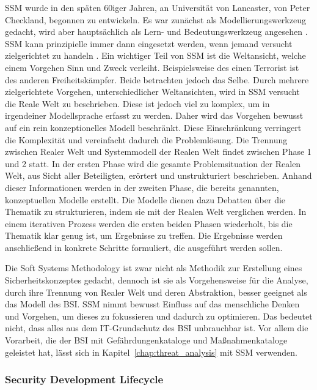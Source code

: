 \documentclass[11pt,a4paper]{report}
\begin{document}
SSM wurde in den späten 60iger Jahren, an Universität von Lancaster, von Peter Checkland, begonnen zu entwickeln. Es war zunächst als Modellierungswerkzeug gedacht, wird aber hauptsächlich als Lern- und Bedeutungswerkzeug angesehen \cite{bobwill}. SSM kann prinzipielle immer dann eingesetzt werden, wenn jemand versucht zielgerichtet zu handeln \cite{checkland1}. Ein wichtiger Teil von SSM ist die Weltansicht, welche einem Vorgehen Sinn und Zweck verleiht. Beispielsweise des einen Terrorist ist des anderen Freiheitskämpfer. Beide betrachten jedoch das Selbe. Durch mehrere zielgerichtete Vorgehen, unterschiedlicher Weltansichten, wird in SSM versucht die Reale Welt zu beschrieben. Diese ist jedoch viel zu komplex, um in irgendeiner Modellsprache erfasst zu werden. Daher wird das Vorgehen bewusst auf ein rein konzeptionelles Modell beschränkt. Diese Einschränkung verringert die Komplexität und vereinfacht dadurch die Problemlösung. Die Trennung zwischen Realer Welt und Systemmodell der Realen Welt findet zwischen Phase 1 und 2 statt. In der ersten Phase wird die gesamte Problemsituation der Realen Welt, aus Sicht aller Beteiligten, erörtert und unstrukturiert beschrieben. Anhand dieser Informationen werden in der zweiten Phase, die bereits genannten, konzeptuellen Modelle erstellt. Die Modelle dienen dazu Debatten über die Thematik zu strukturieren, indem sie mit der Realen Welt verglichen werden. In einem iterativen Prozess werden die ersten beiden Phasen wiederholt, bis die Thematik klar genug ist, um Ergebnisse zu treffen. Die Ergebnisse werden anschließend in konkrete Schritte formuliert, die ausgeführt werden sollen. 

Die Soft Systems Methodology ist zwar nicht als Methodik zur Erstellung eines Sicherheitskonzeptes gedacht, dennoch ist sie als Vorgehensweise für die Analyse, durch ihre Trennung von Realer Welt und deren Abstraktion, besser geeignet als das Modell des BSI. SSM nimmt bewusst Einfluss auf das menschliche Denken und Vorgehen, um dieses zu fokussieren und dadurch zu optimieren. Das bedeutet nicht, dass alles aus dem IT-Grundschutz des BSI unbrauchbar ist. Vor allem die Vorarbeit, die der BSI mit Gefährdungenkataloge und Maßnahmenkataloge geleistet hat, lässt sich in Kapitel~\ref{chap:threat_analysis} mit SSM verwenden.

\subsubsection{Security Development Lifecycle}
\end{document}
